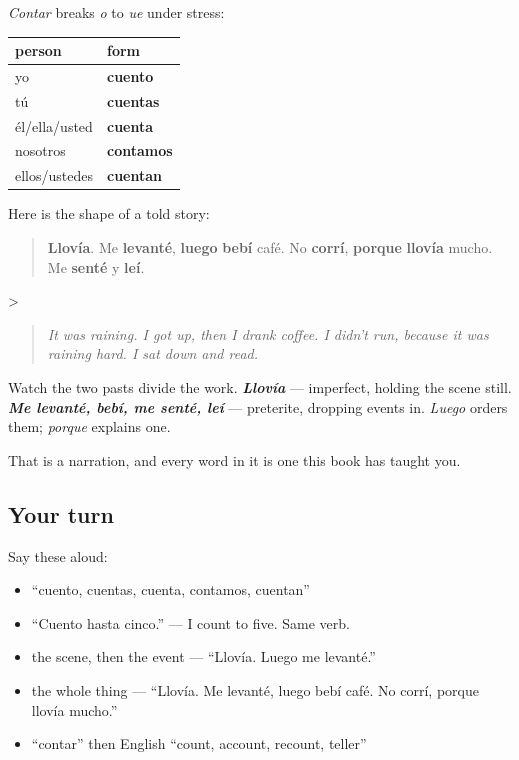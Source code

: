 \begin{grammarlens}[title={Grammar Lens: the backbone of a told story}]
\emph{Contar} breaks \emph{o} to \emph{ue} under stress:

\noindent
\begin{tabularx}{\linewidth}{@{}>{\raggedright\arraybackslash}X>{\raggedright\arraybackslash}X@{}}
\toprule
\textbf{person} & \textbf{form} \\
\midrule
yo & \textbf{cuento} \\
tú & \textbf{cuentas} \\
él/ella/usted & \textbf{cuenta} \\
nosotros & \textbf{contamos} \\
ellos/ustedes & \textbf{cuentan} \\
\bottomrule
\end{tabularx}

Here is the shape of a told story:

\begin{quote}
\textbf{Llovía}. Me \textbf{levanté}, \textbf{luego} \textbf{bebí} café. No \textbf{corrí}, \textbf{porque} \textbf{llovía} mucho. Me \textbf{senté} y \textbf{leí}.
\end{quote}

>

\begin{quote}
\emph{It was raining. I got up, then I drank coffee. I didn't run, because it was raining hard. I sat down and read.}
\end{quote}

Watch the two pasts divide the work. \emph{\textbf{Llovía}} — imperfect, holding the scene still. \emph{\textbf{Me levanté\emph{, }bebí\emph{, }me senté\emph{, }leí}} — preterite, dropping events in. \emph{Luego} orders them; \emph{porque} explains one.

That is a narration, and every word in it is one this book has taught you.
\end{grammarlens}

\subsection*{Your turn}
Say these aloud:

\begin{itemize}
\raggedright
  \item \textquotedblleft{}cuento, cuentas, cuenta, contamos, cuentan\textquotedblright{}
  \item \textquotedblleft{}Cuento hasta cinco.\textquotedblright{} — I count to five. Same verb.
  \item the scene, then the event — \textquotedblleft{}Llovía. Luego me levanté.\textquotedblright{}
  \item the whole thing — \textquotedblleft{}Llovía. Me levanté, luego bebí café. No corrí, porque llovía mucho.\textquotedblright{}
  \item \textquotedblleft{}contar\textquotedblright{} then English \textquotedblleft{}count, account, recount, teller\textquotedblright{}
\end{itemize}

